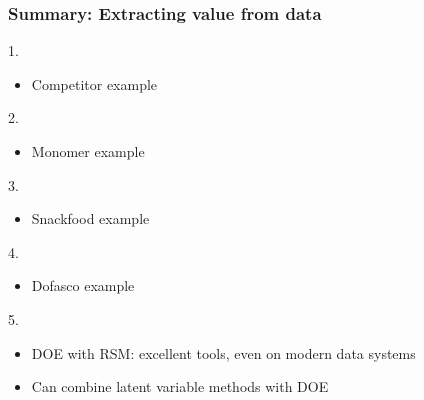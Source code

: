 \begin{frame}\frametitle{Summary: Extracting value from data}

	1. {\color{myOrange}{Improve process understanding}}
	\begin{itemize}
		\item	Competitor example
	\end{itemize}
	2. {\color{myOrange}{Troubleshooting process problems}}
	\begin{itemize}
		\item	Monomer example
	\end{itemize}
	3. {\color{myOrange}{Predictive modelling (inferential sensors)}}
	\begin{itemize}
		\item	Snackfood example
	\end{itemize}
	4. {\color{myOrange}{Process monitoring}}
	\begin{itemize}
		\item	Dofasco example
	\end{itemize}
	5. {\color{myOrange}{Optimizing and improving processes}}
	\begin{itemize}
		\item	DOE with RSM: excellent tools, even on modern data systems
		\item	Can combine latent variable methods with DOE
	\end{itemize}
\end{frame}
